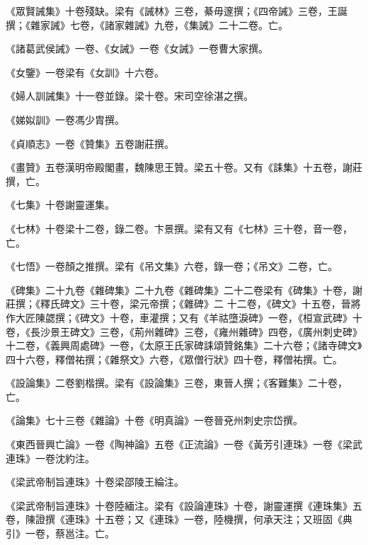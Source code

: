 \begin{pinyinscope}
 《眾賢誡集》十卷殘缺。梁有《誡林》三卷，綦毋邃撰；《四帝誡》三卷，王誕撰；《雜家誡》七卷，《諸家雜誡》九卷，《集誡》二十二卷。亡。



 《諸葛武侯誡》一卷、《女誡》一卷《女誡》一卷曹大家撰。



 《女鑒》一卷梁有《女訓》十六卷。



 《婦人訓誡集》十一卷並錄。梁十卷。宋司空徐湛之撰。



 《娣姒訓》一卷馮少胄撰。



 《貞順志》一卷《贊集》五卷謝莊撰。



 《畫贊》五卷漢明帝殿閣畫，魏陳思王贊。梁五十卷。又有《誄集》十五卷，謝莊撰，亡。



 《七集》十卷謝靈運集。



 《七林》十卷梁十二卷，錄二卷。卞景撰。梁有又有《七林》三十卷，音一卷，亡。



 《七悟》一卷顏之推撰。梁有《吊文集》六卷，錄一卷；《吊文》二卷，亡。



 《碑集》二十九卷《雜碑集》二十九卷《雜碑集》二十二卷梁有《碑集》十卷，謝莊撰；《釋氏碑文》三十卷，梁元帝撰；《雜碑》二
 十二卷，《碑文》十五卷，晉將作大匠陳勰撰；《碑文》十卷，車灌撰；又有《羊祜墮淚碑》一卷，《桓宣武碑》十卷，《長沙景王碑文》三卷，《荊州雜碑》三卷，《雍州雜碑》四卷，《廣州刺史碑》十二卷，《義興周處碑》一卷，《太原王氏家碑誄頌贊銘集》二十六卷；《諸寺碑文》四十六卷，釋僧祐撰；《雜祭文》六卷，《眾僧行狀》四十卷，釋僧祐撰。亡。



 《設論集》二卷劉楷撰。梁有《設論集》三卷，東晉人撰；《客難集》二十卷，亡。



 《論集》七十三卷《雜論》十卷《明真論》一卷晉兗州刺史宗岱撰。



 《東西晉興亡論》一卷《陶神論》五卷《正流論》一卷《黃芳引連珠》一卷《梁武連珠》一卷沈約注。



 《梁武帝制旨連珠》十卷梁邵陵王綸注。



 《梁武帝制旨連珠》十卷陸緬注。梁有《設論連珠》十卷，謝靈運撰《連珠集》五卷，陳證撰《連珠》十五卷；又《連珠》一卷，陸機撰，何承天注；又班固《典引》一卷，蔡邕注。亡。




\end{pinyinscope}
